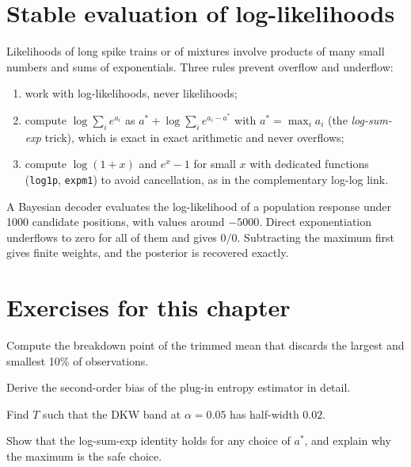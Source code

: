 \section{Stable evaluation of log-likelihoods}
Likelihoods of long spike trains or of mixtures involve products of many
small numbers and sums of exponentials. Three rules prevent overflow and
underflow:
\begin{enumerate}[leftmargin=2em]
\item work with log-likelihoods, never likelihoods;
\item compute $\log\sum_ie^{a_i}$ as $a^\ast+\log\sum_ie^{a_i-a^\ast}$ with
$a^\ast=\max_ia_i$ (the \emph{log-sum-exp} trick), which is exact in
exact arithmetic and never overflows;
\item compute $\log(1+x)$ and $e^x-1$ for small $x$ with dedicated
functions (\texttt{log1p}, \texttt{expm1}) to avoid cancellation, as in
the complementary log-log link.
\end{enumerate}
\begin{example}
A Bayesian decoder evaluates the log-likelihood of a population response
under 1000 candidate positions, with values around $-5000$. Direct
exponentiation underflows to zero for all of them and gives $0/0$.
Subtracting the maximum first gives finite weights, and the posterior is
recovered exactly.
\end{example}

\section*{Exercises for this chapter}
\begin{exercise}
Compute the breakdown point of the trimmed mean that discards the
largest and smallest 10\% of observations.
\end{exercise}
\begin{exercise}
Derive the second-order bias of the plug-in entropy estimator in detail.
\end{exercise}
\begin{exercise}
Find $T$ such that the DKW band at $\alpha=0.05$ has half-width $0.02$.
\end{exercise}
\begin{exercise}
Show that the log-sum-exp identity holds for any choice of $a^\ast$, and
explain why the maximum is the safe choice.
\end{exercise}
